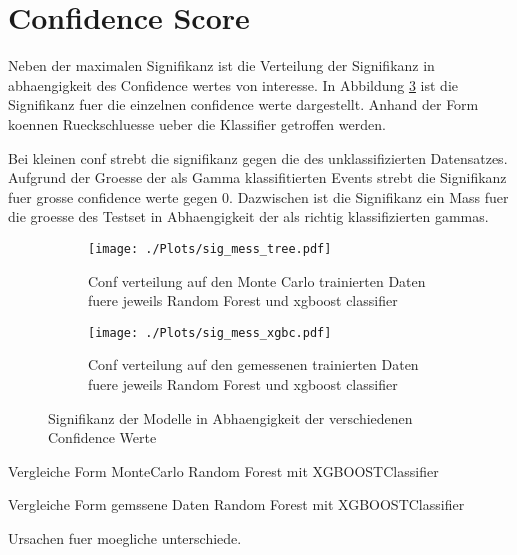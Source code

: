 \section{Confidence Score}
Neben der maximalen Signifikanz ist die Verteilung der Signifikanz in abhaengigkeit des Confidence wertes von interesse. 
In Abbildung \ref{fig:signconf} ist die Signifikanz fuer die einzelnen confidence werte dargestellt. 
Anhand der Form koennen Rueckschluesse ueber die Klassifier getroffen werden. 

Bei kleinen conf strebt die signifikanz gegen die des unklassifizierten Datensatzes.
Aufgrund der Groesse der als Gamma klassifitierten Events strebt die Signifikanz fuer grosse confidence werte gegen 0.
Dazwischen ist die Signifikanz ein Mass fuer die groesse des Testset in Abhaengigkeit der als richtig klassifizierten gammas.
\begin{figure}[H]
  \centering
  \begin{subfigure}[b]{0.48\textwidth}
  \centering
  \texttt{[image: ./Plots/sig\_mess\_tree.pdf]}
  \caption{Conf verteilung auf den Monte Carlo trainierten Daten fuere jeweils Random Forest und xgboost classifier}
  \label{fig:signconfMC}
\end{subfigure}
\begin{subfigure}[b]{0.48\textwidth}
  \centering
  \texttt{[image: ./Plots/sig\_mess\_xgbc.pdf]}
  \caption{Conf verteilung auf den gemessenen trainierten Daten fuere jeweils Random Forest und xgboost classifier}
  \label{fig:signconfMESS}
\end{subfigure}
\caption{Signifikanz der Modelle in Abhaengigkeit der verschiedenen Confidence Werte}
\label{fig:signconf}
\end{figure}

Vergleiche Form MonteCarlo Random Forest mit XGBOOSTClassifier 

Vergleiche Form gemssene Daten Random Forest mit XGBOOSTClassifier 

Ursachen fuer moegliche unterschiede.

